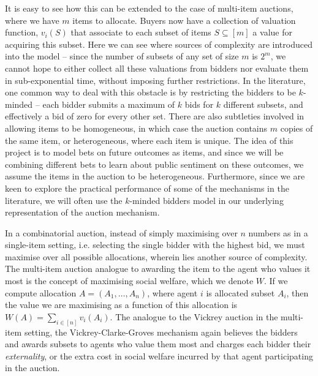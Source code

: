 \documentclass[10pt,a4paper]{article}
\theoremstyle{plain}
\theoremstyle{definition}
\begin{document}
	It is easy to see how this can be extended to the case of multi-item
	auctions, where we have $m$ items to allocate. Buyers now have a collection
	of valuation function, $v_i(S)$ that associate to each subset of items $S
	\subseteq [m]$ a value for acquiring this subset. Here we can see where
	sources of complexity are introduced into the model -- since the number of
	subsets of any set of size $m$ is $2^m$, we cannot hope to either collect
	all these valuations from bidders nor evaluate them in sub-exponential
	time, without imposing further restrictions. In the literature, one common
	way to deal with this obstacle is by restricting the bidders to be
	$k$-minded -- each bidder submits a maximum of $k$ bids for $k$ different
	subsets, and effectively a bid of zero for every other set. There are also
	subtleties involved in allowing items to be homogeneous, in which case the
	auction contains $m$ copies of the same item, or heterogeneous, where each
	item is unique.  The idea of this project is to model bets on future
	outcomes as items, and since we will be combining different bets to learn
	about public sentiment on these outcomes, we assume the items in the
	auction to be heterogeneous. Furthermore, since we are keen to explore the
	practical performance of some of the mechanisms in the literature, we will
	often use the $k$-minded bidders model in our underlying representation of
	the auction mechanism.

	In a combinatorial auction, instead of simply maximising over $n$ numbers
	as in a single-item setting, i.e. selecting the single bidder with the
	highest bid, we must maximise over all possible allocations, wherein lies
	another source of complexity. The multi-item auction analogue to awarding
	the item to the agent who values it most is the concept of maximising
	social welfare, which we denote $W$. If we compute allocation $A = (A_1,
	\ldots, A_n)$, where agent $i$ is allocated subset $A_i$, then the value we
	are maximising as a function of this allocation is $W(A) = \sum_{i \in [n]}
	v_i(A_i)$.  The analogue to the Vickrey auction in the multi-item setting,
	the Vickrey-Clarke-Groves mechanism \cite{Vickrey1961, Clarke1971,
	Groves1973} again believes the bidders and awards subsets to agents who
	value them most and charges each bidder their \emph{externality}, or the
	extra cost in social welfare incurred by that agent participating in the
	auction.
\end{document}
